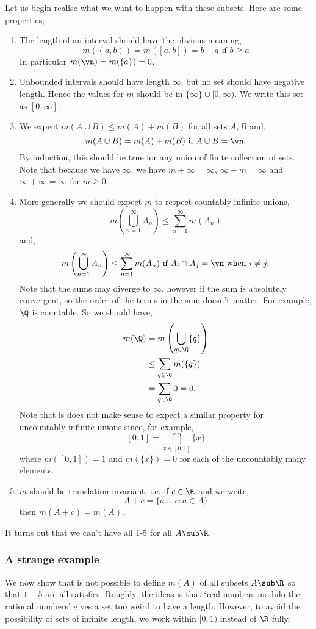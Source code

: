 \noindent
Let us begin realise what we want to happen with these subsets. Here are some properties,
\begin{enumerate}
  \item The length of an interval should have the obvious meaning,
  $$ m((a, b)) = m([a, b]) = b- a \text{ if } b \ge a $$
  In particular $m(\vn) = m(\{a\}) = 0$.
  \item Unbounded intervals should have length $\infty$, but no set should have negative length. Hence the values for $m$ should be in $\{\infty\} \cup [0, \infty)$. We write this set as $[0, \infty]$.
  \item We expect $m(A \cup B) \le m(A) + m(B)$ for all sets $A, B$ and,
  $$ m(A \cup B) = m(A) + m(B) \text{ if } A\cup B = \vn. $$
  By induction, this should be true for any union of finite collection of sets. Note that because we have $\infty$, we have $m + \infty = \infty$, $\infty + m = \infty$ and $\infty + \infty = \infty$ for $m \ge 0$.
  \item More generally we should expect $m$ to respect countably infinite unions,
  $$ m\left( \bigcup_{n=1}^\infty A_n \right) \le \sum_{n=1}^\infty m(A_n) $$
  and,
  $$ m\left( \bigcup_{n=1}^\infty A_n \right) \le \sum_{n=1}^\infty m(A_n) \text{ if }A_i \cap A_j = \vn \text{ when }i \ne j. $$
  Note that the sums may diverge to $\infty$, however if the sum is absolutely convergent, so the order of the terms in the sum doesn't matter. For example, $\Q$ is countable. So we should have,
  \begin{align*}
    m(\Q) &= m\left( \bigcup_{q \in \Q} \{q\} \right)\\
    &\le \sum_{q \in \Q} m(\{q\})\\
    &= \sum_{q \in \Q} 0 = 0.
  \end{align*}
  \noindent
  Note that is does not make sense to expect a similar property for uncountably infinite unions since, for example,
  $$ [0, 1] = \bigcap_{x \in [0, 1]} \{x\} $$
  where $m([0, 1]) = 1$ and $m(\{x\}) = 0$ for each of the uncountably many elements.
  \item $m$ should be translation invariant, i.e. if $c \in \R$ and we write,
  $$ A + c = \{a + c : a \in A\} $$
  then $m(A + c) = m(A)$.
\end{enumerate}
\noindent
It turns out that we can't have all 1-5 for all $A \sub \R$.
\subsubsection{A strange example}
We now show that is not possible to define $m(A)$ of all subsets $A \sub \R$ so that $1 - 5$ are all satisfies. Roughly, the ideas is that `real numbers modulo the rational numbers' gives a set too weird to have a length. However, to avoid the possibility of sets of infinite length, we work within $[0 ,1)$ instead of $\R$ fully. \\

